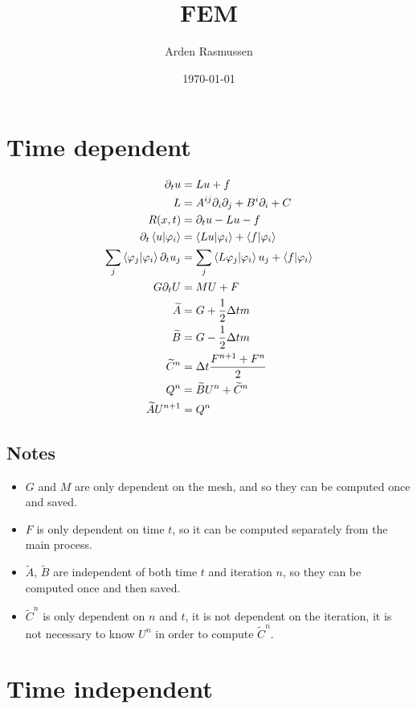 \documentclass[12pt]{amsart}
\title{FEM}
\author{Arden Rasmussen}
\date{\today}
\newcommand{\p}{\partial}
\newcommand{\ph}{\varphi}
\newcommand{\wt}[1]{\widetilde{#1}}
\begin{document}
\maketitle

\section{Time dependent}%
\label{sec:time_dependent}

\begin{align*}
  \p_tu&=Lu+f\\
   L&=A^{ij}\p_i\p_j+B^i\p_i+C\\
   R(x,t)&=\p_tu-Lu-f\\
   \p_t\ip{u}{\ph_i}&=\ip{Lu}{\ph_i}+\ip{f}{\ph_i}\\
   \sum_j\ip{\ph_j}{\ph_i}\p_tu_j&=\sum_j\ip{L\ph_j}{\ph_i}u_j+\ip{f}{\ph_i}\\
   G\p_t U &=MU+F\\
   \wt{A}&=G+\frac{1}{2}\Delta tm\\
   \wt{B}&=G-\frac{1}{2}\Delta tm\\
   \wt{C}^n&=\Delta t\frac{F^{n+1}+F^n}{2}\\
   Q^n&=\wt{B}U^n+\wt{C}^n\\
   \wt{A}U^{n+1}&=Q^n
\end{align*}

\subsection{Notes}%
\label{sub:notes}

\begin{itemize}
  \item $G$ and $M$ are only dependent on the mesh, and so they can be computed
    once and saved.
  \item $F$ is only dependent on time $t$, so it can be computed separately
    from the main process.
  \item $\wt{A}$, $\wt{B}$ are independent of both time $t$ and iteration $n$,
    so they can be computed once and then saved.
  \item $\wt{C}^n$ is only dependent on $n$ and $t$, it is not dependent on the
    iteration, it is not necessary to know $U^n$ in order to compute
    $\wt{C}^n$.
\end{itemize}

\section{Time independent}%
\label{sec:time_indpendent}
\end{document}
